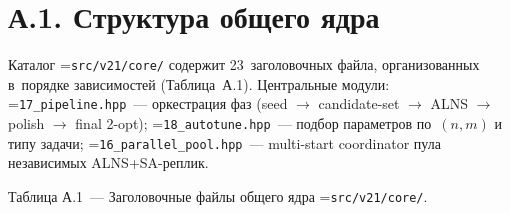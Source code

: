 \documentclass[a4paper,14pt]{extreport}
\makeatletter
\let\old@texttt\texttt
\renewcommand{\texttt}[1]{{\sloppy\hyphenchar\font=\m@ne\old@texttt{#1}}}
\makeatother
\begin{document}
\section*{А.1. Структура общего ядра}

Каталог \texttt{src/v21/core/} содержит 23~заголовочных файла, организованных в~порядке зависимостей (Таблица~А.1). Центральные модули: \texttt{17\_pipeline.hpp}~--- оркестрация фаз (seed $\to$ candidate-set $\to$ ALNS $\to$ polish $\to$ final 2-opt); \texttt{18\_autotune.hpp}~--- подбор параметров по~$(n, m)$ и типу задачи; \texttt{16\_parallel\_pool.hpp}~--- multi-start coordinator пула независимых ALNS+SA-реплик.

\medskip
\noindent Таблица А.1~--- Заголовочные файлы общего ядра \texttt{src/v21/core/}.
\end{document}
